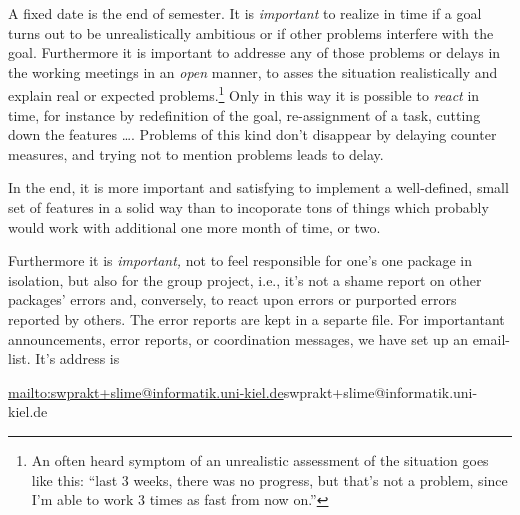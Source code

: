 A fixed date is the end of semester.  It is \emph{important} to realize in
time if a goal turns out to be unrealistically ambitious or if other
problems interfere with the goal. Furthermore it is important to addresse
any of those problems or delays in the working meetings in an \emph{open}
manner, to asses the situation realistically and explain real or expected
problems.\footnote{An often heard symptom of an unrealistic assessment of
  the situation goes like this: ``last 3 weeks, there was no progress, but
  that's not a problem, since I'm able to work 3 times as fast from now
  on.''} Only in this way it is possible to \emph{react} in time, for
instance by redefinition of the goal, re-assignment of a task, cutting down
the features \ldots.  Problems of this kind don't disappear by delaying
counter measures, and trying not to mention problems leads to delay.

In the end, it is more important and satisfying to implement a
well-defined, small set of features in a solid way than to incoporate tons
of things which probably would work with additional one more month of time,
or two.



Furthermore it is \emph{important,} not to feel responsible for one's one
package in isolation, but also for the group project, i.e., it's not a
shame report on other packages' errors and, conversely, to react upon
errors or purported errors reported by others. The error reports are kept
in a separte file. For importantant announcements, error reports, or
coordination messages, we have set up an email-list. It's address is
\begin{center}
  \url{mailto:swprakt+slime@informatik.uni-kiel.de}{swprakt+slime@informatik.uni-kiel.de}
\end{center}





